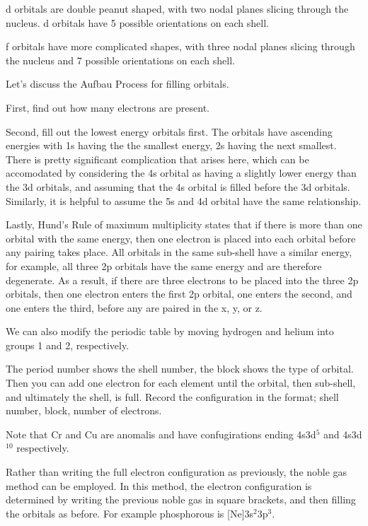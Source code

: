 \documentclass[../chem.tex]{subfiles}
\begin{document}
d orbitals are double peanut shaped, with two nodal planes slicing through the nucleus. d orbitals have 5 possible orientations on each shell.

f orbitals have more complicated shapes, with three nodal planes slicing through the nucleus and 7 possible orientations on each shell.

Let's discuss the Aufbau Process for filling orbitals.

First, find out how many electrons are present. 

Second, fill out the lowest energy orbitals first. The orbitals have ascending energies with 1s having the the smallest energy, 2s having the next smallest.
There is pretty significant complication that arises here, which can be accomodated by considering the 4s orbital as having a slightly lower energy than the 3d orbitals, 
and assuming that the 4s orbital is filled before the 3d orbitals. Similarly, it is helpful to assume the 5s and 4d orbital have the same relationship.

Lastly, Hund's Rule of maximum multiplicity states that if there is more than one orbital with the same energy, then one electron is placed
into each orbital before any pairing takes place. All orbitals in the same sub-shell have a similar energy, for example, all three 2p orbitals have 
the same energy and are therefore degenerate. As a result, if there are three electrons to be placed into the three 2p orbitals, then one electron enters the first 2p orbital,
one enters the second, and one enters the third, before any are paired in the x, y, or z.

We can also modify the periodic table by moving hydrogen and helium into groups 1 and 2, respectively. 

The period number shows the shell number, the block shows the type of orbital. Then you can add one electron for each element until the orbital, then sub-shell, and ultimately the shell,  is full.
Record the configuration in the format;
shell number, block, number of electrons.

Note that Cr and Cu are anomalis and have confugirations ending 4s3d$^5$ and 4s3d$^{10}$ respectively.

Rather than writing the full electron configuration as previously, the noble gas method can be employed. In this method, the electron 
configuration is determined by writing the previous noble gas in square brackets, and then filling the orbitals as before. For example phosphorous is [Ne]3s$^2$3p$^3$.
\end{document}

